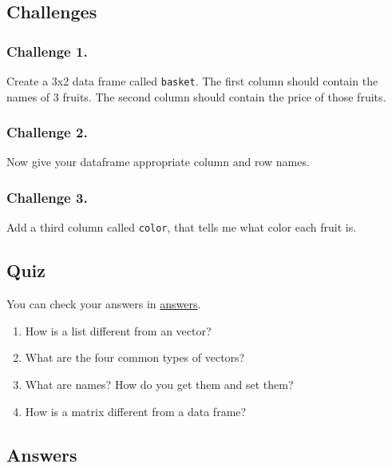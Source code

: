 \documentclass[]{book}
\begin{document}
\subsection{Challenges}\label{challenges-8}

\subsubsection*{Challenge 1.}\label{challenge-1.-3}

Create a 3x2 data frame called \texttt{basket}. The first column should
contain the names of 3 fruits. The second column should contain the
price of those fruits.

\subsubsection*{Challenge 2.}\label{challenge-2.-3}

Now give your dataframe appropriate column and row names.

\subsubsection*{Challenge 3.}\label{challenge-3.-2}

Add a third column called \texttt{color}, that tells me what color each
fruit is.

\subsection{Quiz}\label{quiz}

You can check your answers in
\protect\hyperlink{data-structure-answers}{answers}.

\begin{enumerate}
\def\labelenumi{\arabic{enumi}.}
\item
  How is a list different from an vector?
\item
  What are the four common types of vectors?
\item
  What are names? How do you get them and set them?
\item
  How is a matrix different from a data frame?
\end{enumerate}

\hypertarget{data-structure-answers}{\subsection{Answers}\label{data-structure-answers}}
\end{document}
